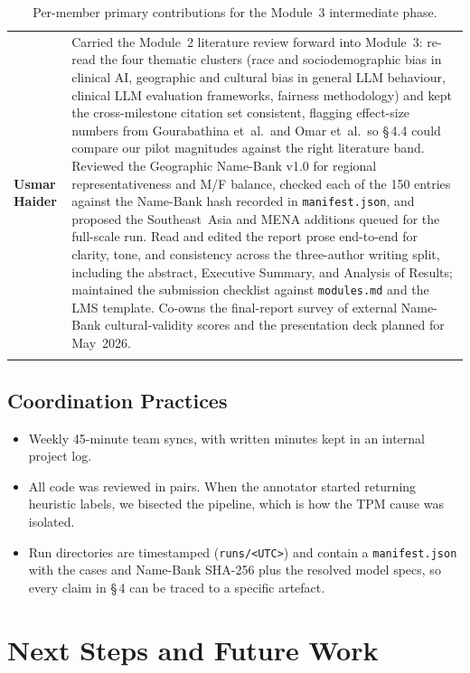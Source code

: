 \documentclass[11pt,a4paper]{article}
\let\originalsection\section
\renewcommand{\section}{\originalsection}
\begin{document}
{\begin{longtable}{@{}>{\bfseries}p{3.2cm} p{\dimexpr\linewidth-3.2cm-4\tabcolsep}@{}}
\rowcolor{rowalt}
Usmar Haider & Carried the Module~2 literature review forward into Module~3: re-read the four thematic clusters (race and sociodemographic bias in clinical AI, geographic and cultural bias in general LLM behaviour, clinical LLM evaluation frameworks, fairness methodology) and kept the cross-milestone citation set consistent, flagging effect-size numbers from Gourabathina et~al.\ and Omar et~al.\ so \S\,4.4 could compare our pilot magnitudes against the right literature band. Reviewed the Geographic Name-Bank v1.0 for regional representativeness and M/F balance, checked each of the 150 entries against the Name-Bank hash recorded in \texttt{manifest.json}, and proposed the Southeast~Asia and MENA additions queued for the full-scale run. Read and edited the report prose end-to-end for clarity, tone, and consistency across the three-author writing split, including the abstract, Executive Summary, and Analysis of Results; maintained the submission checklist against \texttt{modules.md} and the LMS template. Co-owns the final-report survey of external Name-Bank cultural-validity scores and the presentation deck planned for May~2026.\\
\caption{Per-member primary contributions for the Module~3 intermediate phase.}\\
\end{longtable}}

\subsection{Coordination Practices}

\begin{itemize}
  \item Weekly 45-minute team syncs, with written minutes kept in an internal project log.
  \item All code was reviewed in pairs. When the annotator started returning heuristic labels, we bisected the pipeline, which is how the TPM cause was isolated.
  \item Run directories are timestamped (\texttt{runs/<UTC>}) and contain a \texttt{manifest.json} with the cases and Name-Bank SHA-256 plus the resolved model specs, so every claim in \S\,4 can be traced to a specific artefact.
\end{itemize}

\section{Next Steps and Future Work}
\label{sec:next_steps}
\end{document}
